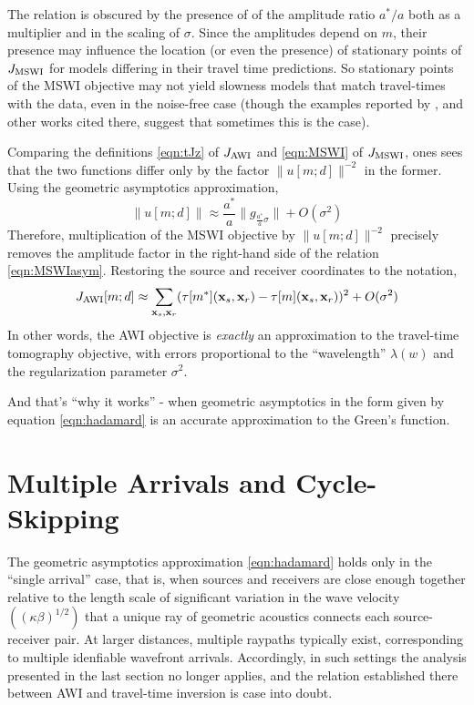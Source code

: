 The relation is obscured by the presence of of the amplitude ratio
$a^*/a$ both as a multiplier and in the scaling of $\sigma$. Since the
amplitudes depend on $m$, their presence may influence the location
(or even the presence) of stationary points of $J_{\rm MSWI}$ for
models differing in their travel time predictions. So stationary
points of the MSWI objective may not yield slowness models that match
travel-times with the data, even in the noise-free case (though
the examples reported by \cite{HuangSymes2015SEG, HuangSymes:Geo17}, and other works
cited there, suggest that sometimes this is the case).

Comparing the definitions \ref{eqn:tJz} of $J_{\rm AWI}$ and
\ref{eqn:MSWI} of $J_{\rm MSWI}$, ones sees
that the two functions differ only by the factor $\|u[m;d]\|^{-2}$ in
the former. Using the geometric asymptotics approximation, 
$$
\|u[m;d]\| \approx \frac{a^*}{a}\|g_{\frac{a^*}{a}\sigma}\| + O(\sigma^2)
$$
Therefore, multiplication of the MSWI objective by $\|u[m;d]\|^{-2}$
precisely removes the amplitude factor in the right-hand side of the
relation \ref{eqn:MSWIasym}. Restoring the source and receiver
coordinates to the notation,
$$
J_{\rm AWI}[m;d] \approx \sum_{{\bf x}_s,{\bf x}_r} (\tau[m^*]({\bf
  x}_s,{\bf x}_r)-\tau[m]({\bf x}_s,{\bf x}_r))^2 + O(\sigma^2)
$$
In other words, the AWI objective is {\em exactly} an approximation to
the travel-time tomography objective, with errors proportional to the
``wavelength'' $\lambda(w)$ and the regularization parameter
$\sigma^2$.

And that's ``why it works'' - when geometric asymptotics in the form
given by equation \ref{eqn:hadamard} is an accurate approximation to the Green's function.

\section{Multiple Arrivals and Cycle-Skipping}
The geometric asymptotics approximation \ref{eqn:hadamard} holds only
in the ``single arrival'' case, that is, when sources and receivers
are close enough together relative to the length scale of significant
variation in the wave velocity $((\kappa\beta)^{1/2})$ that a unique ray of
geometric acoustics connects each source-receiver pair. At larger
distances, multiple raypaths typically exist, corresponding to
multiple idenfiable wavefront arrivals. Accordingly, in such settings
the analysis presented in the last section no longer applies, and the
relation established there between AWI and travel-time inversion is
case into doubt.

